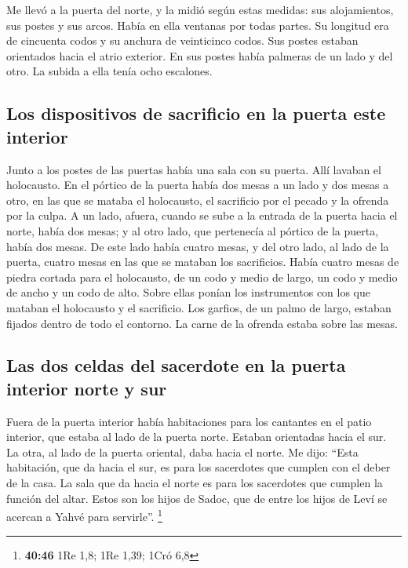  Me llevó a la puerta del norte, y la midió según estas
medidas:  sus alojamientos, sus postes y sus arcos. Había
en ella ventanas por todas partes. Su longitud era de cincuenta codos y
su anchura de veinticinco codos.  Sus postes estaban
orientados hacia el atrio exterior. En sus postes había palmeras de un
lado y del otro. La subida a ella tenía ocho escalones.

\hypertarget{los-dispositivos-de-sacrificio-en-la-puerta-este-interior}{%
\subsection{Los dispositivos de sacrificio en la puerta este
interior}\label{los-dispositivos-de-sacrificio-en-la-puerta-este-interior}}

 Junto a los postes de las puertas había una sala con su
puerta. Allí lavaban el holocausto.  En el pórtico de la
puerta había dos mesas a un lado y dos mesas a otro, en las que se
mataba el holocausto, el sacrificio por el pecado y la ofrenda por la
culpa.  A un lado, afuera, cuando se sube a la entrada de
la puerta hacia el norte, había dos mesas; y al otro lado, que
pertenecía al pórtico de la puerta, había dos mesas.  De
este lado había cuatro mesas, y del otro lado, al lado de la puerta,
cuatro mesas en las que se mataban los sacrificios. 
Había cuatro mesas de piedra cortada para el holocausto, de un codo y
medio de largo, un codo y medio de ancho y un codo de alto. Sobre ellas
ponían los instrumentos con los que mataban el holocausto y el
sacrificio.  Los garfios, de un palmo de largo, estaban
fijados dentro de todo el contorno. La carne de la ofrenda estaba sobre
las mesas.

\hypertarget{las-dos-celdas-del-sacerdote-en-la-puerta-interior-norte-y-sur}{%
\subsection{Las dos celdas del sacerdote en la puerta interior norte y
sur}\label{las-dos-celdas-del-sacerdote-en-la-puerta-interior-norte-y-sur}}

 Fuera de la puerta interior había habitaciones para los
cantantes en el patio interior, que estaba al lado de la puerta norte.
Estaban orientadas hacia el sur. La otra, al lado de la puerta oriental,
daba hacia el norte.  Me dijo: ``Esta habitación, que da
hacia el sur, es para los sacerdotes que cumplen con el deber de la
casa.  La sala que da hacia el norte es para los
sacerdotes que cumplen la función del altar. Estos son los hijos de
Sadoc, que de entre los hijos de Leví se acercan a Yahvé para
servirle''. \footnote{\textbf{40:46} 1Re 1,8; 1Re 1,39; 1Cró 6,8}

